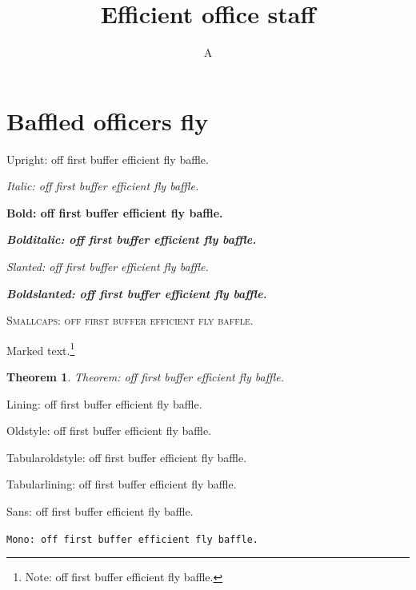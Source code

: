 \documentclass{article}
\title{Efficient office staff}
\author{A}
\date{}
\newtheorem{theorem}{Theorem}
\begin{document}
\maketitle

\section{Baffled officers fly}

Upright: off first buffer efficient fly baffle.

\textit{Italic: off first buffer efficient fly baffle.}

\textbf{Bold: off first buffer efficient fly baffle.}

\textbf{\textit{Bolditalic: off first buffer efficient fly baffle.}}

\textsl{Slanted: off first buffer efficient fly baffle.}

\textbf{\textsl{Boldslanted: off first buffer efficient fly baffle.}}

\textsc{Smallcaps: off first buffer efficient fly baffle.}

Marked text.\footnote{Note: off first buffer efficient fly baffle.}

\begin{theorem}
Theorem: off first buffer efficient fly baffle.
\end{theorem}

{\selectfont Lining: off first buffer efficient fly baffle.}

{\selectfont Oldstyle: off first buffer efficient fly baffle.}

{\selectfont Tabularoldstyle: off first buffer efficient fly baffle.}

{\selectfont Tabularlining: off first buffer efficient fly baffle.}

\textsf{Sans: off first buffer efficient fly baffle.}

\texttt{Mono: off first buffer efficient fly baffle.}
\end{document}
